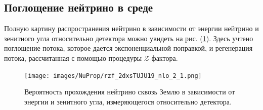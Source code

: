 \subsection{Поглощение нейтрино в среде}
Полную картину распространения нейтрино в зависимости от энергии нейтрино и зенитного угла относительно детектора  можно увидеть на рис. (\ref{EF2}). Здесь учтено поглощение потока, которое дается экспоненциальной поправкой, и регенерация потока, рассчитанная с помощью процедуры $\mathcal{Z}$-фактора.
\begin{figure}[!h]
\centering
\texttt{[image: images/NuProp/rzf\_2dxsTUJU19\_nlo\_2\_1.png]}
\caption{Вероятность прохождения нейтрино сквозь Землю в зависимости от энергии и зенитного угла, измеряющегося относительно детектора.}
\label{EF2}
\end{figure}
